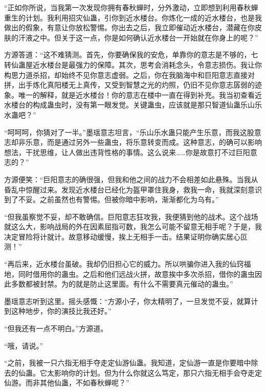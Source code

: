 
\begin{this_body}



“正如你所说，当我第一次发现你拥有春秋蝉时，分外激动，立即想到利用春秋蝉重生的计划。我利用招灾仙蛊，引你到近水楼台。你炼化一成的近水楼台，也是我做出的假象，有意让你放松警惕。你出去之后，我立即催动近水楼台，潜藏在你皮肤的汗液之中。但关于这一点，你是如何确认近水楼台一开始就在你身上的呢？”

方源答道：“这不难猜测。首先，你要确保我的安危，单靠你的意志是不够的，七转仙蛊屋近水楼台是最强力的保障。其次，思考会消耗念头，令意志损伤。我让你构思力道杀招，却始终不见你意志虚弱。之后，你在我脑海中和巨阳意志直接对拼，出手炼化真阳楼无上真传，又受到智慧之光的灼照，仍旧不见你意志孱弱的迹象。唯一的解释，就是近水楼台！你的意志在楼中一直在得到补充。我当初查看近水楼台的构成蛊虫时，没有第一眼发觉。关键蛊虫，应该就是那只智道仙蛊乐山乐水蛊吧？”

“呵呵呵，你猜对了一半。”墨瑶意志坦言，“乐山乐水蛊只能产生乐意，而我这股意志却非乐意，而是通过另外一些蛊虫，将乐意转变而成。这种意志，的确可以影响想法，干扰思维，让人做出违背性格的事情。这么说来……你是故意打不过巨阳意志的？”

方源便笑：“巨阳意志的确很强，但我和他之间的战力不会相差如此悬殊。当我从昏乱中惊醒过来。发现近水楼台已经化为盔甲罩住我身，救我一命，我就深刻意识到了不妥。之前虽然也有警惕。但被你暗中影响，渐渐都化为乌有。”

“但我虽察觉不妥，却不敢确信。巨阳意志狂攻我，我便猜到他的战术。这个战场就这么大，影响战局的外在因素屈指可数，我怎么可能不留意无相手呢？于是，我决定冒险将计就计。故意移动缓慢，挨上无相手一击。结果证明你确实居心叵测！”

“再后来，近水楼台虽破。我却仍旧担心它的威力。所以哄骗你进入我的仙窍福地，同时借用你的蛊虫。之后和他们远战火拼，故意挨中多次杀招，借你的蛊虫因此多数都被封禁。为的就是防止这里面。有什么不需要真元催动的蛊虫。”

墨瑶意志听到这里。摇头感慨：“方源小子，你太精明了，一旦发觉不妥，就算计到这种地步，你的演技比我还好。”

“但我还有一点不明白。”方源道。

“哦，请说。”

“之前，我被一只六指无相手夺走定仙游仙蛊。我知道，定仙游一直是你要暗中除去的仙蛊。它太影响你的计划。但为什么你就这么笃定，那只六指无相手会夺走定仙游。而非其他仙蛊，不如春秋蝉呢？”


\end{this_body}
